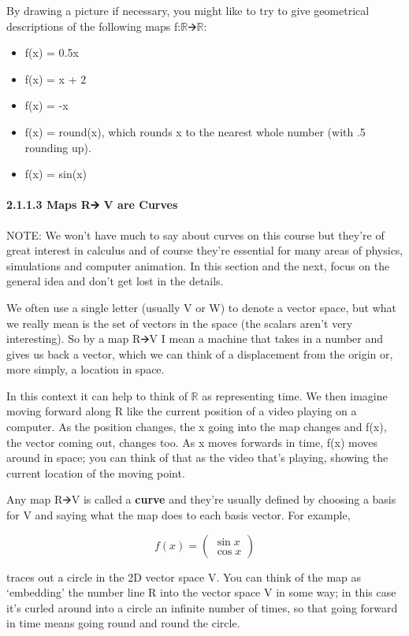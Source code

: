 \documentclass[oneside,english]{amsbook}
\numberwithin{section}{chapter}
\theoremstyle{plain}
\theoremstyle{definition}
\begin{document}
By drawing a picture if necessary, you might like to try to give
geometrical descriptions of the following maps f:$\mathbb{R}$🡪$\mathbb{R}$:

\begin{itemize}
	\item
	f(x) = 0.5x
	\item
	f(x) = x + 2
	\item
	f(x) = -x
	\item
	f(x) = round(x), which rounds x to the nearest whole number (with .5
	rounding up).
	\item
	f(x) = sin(x)
\end{itemize}

\paragraph{2.1.1.3 Maps R🡪 V are Curves}\label{maps-r-v-are-curves}

NOTE: We won't have much to say about curves on this course but they're
of great interest in calculus and of course they're essential for many
areas of physics, simulations and computer animation. In this section
and the next, focus on the general idea and don't get lost in the
details.

We often use a single letter (usually V or W) to denote a vector space,
but what we really mean is the set of vectors in the space (the scalars
aren't very interesting). So by a map R🡪V I mean a machine that takes in
a number and gives us back a vector, which we can think of a
displacement from the origin or, more simply, a location in space.

In this context it can help to think of $\mathbb{R}$ as representing time.
We then imagine moving forward along R like the current position of a
video playing on a computer. As the position changes, the x going into
the map changes and f(x), the vector coming out, changes too. As x moves
forwards in time, f(x) moves around in space; you can think of that as
the video that's playing, showing the current location of the moving
point.

Any map R🡪V is called a \textbf{curve} and they're usually defined by
choosing a basis for V and saying what the map does to each basis
vector. For example,

\[f(x) = \begin{pmatrix}
	\sin x \\
	\cos x
\end{pmatrix}\]

traces out a circle in the 2D vector space V. You can think of the map
as `embedding' the number line R into the vector space V in some way;
in this case it's curled around into a circle an infinite number of
times, so that going forward in time means going round and round the
circle.
\end{document}
